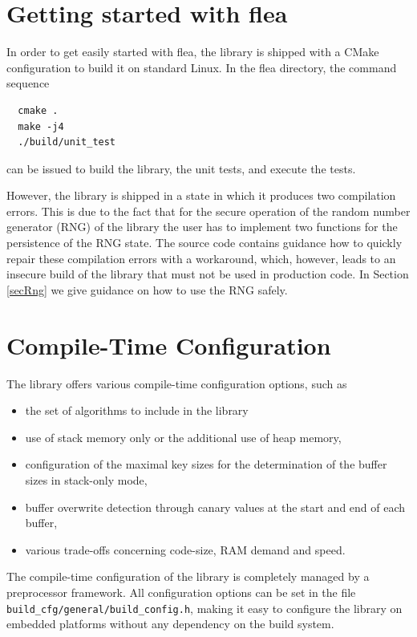 \documentclass[a4paper,11pt]{scrartcl}
\begin{document}
  \section{Getting started with flea}

  In order to get easily started with flea, the library is shipped with a CMake
  configuration to build it on standard Linux. In the
  flea directory, the command sequence 
  \begin{verbatim}
  cmake .
  make -j4
  ./build/unit_test
  \end{verbatim}
  can be issued to build the library, the unit tests, and execute the tests.

  However, the library is shipped in a state in which it produces two
  compilation errors. This is due to the fact that for the secure operation of
  the random number generator (RNG) of the library the user has to implement two
  functions for the persistence of the RNG state. The source code contains
  guidance how to quickly repair these compilation errors with a workaround,
  which, however, leads to an insecure build of the library that must not be
  used in production code. In Section \ref{secRng} we give guidance on how to use
  the RNG safely.

  \section{Compile-Time Configuration}

The library offers various compile-time
configuration options, such as 
\begin{itemize}
  \item the set of algorithms to include in the library
  \item use of stack memory only or the additional use of heap memory,
  \item configuration of the maximal key sizes for the determination of the
    buffer sizes in stack-only mode,
  \item buffer overwrite detection through canary values at the start and end of
    each buffer,
  \item various trade-offs concerning code-size, RAM demand and speed.
  \end{itemize}

  The compile-time configuration of the library is completely managed by a
  preprocessor framework. All configuration options can be set in the file
  \verb#build_cfg/general/build_config.h#, making it easy to configure the
  library on embedded platforms without any dependency on the build system.
\end{document}
